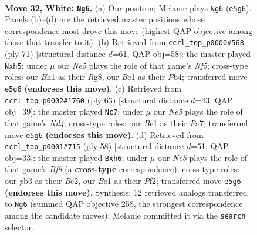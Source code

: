 \documentclass[11pt]{article}
\begin{document}
\clearpage

\begin{figure}[p]\centering
\begin{subfigure}{0.46\textwidth}\centering
\resizebox{\linewidth}{!}{%
\newchessgame
\chessboard[
  setfen={8/8/4k3/3pNp2/2pn1P2/1p6/1P2b3/1K2B2B w - - 0 32},
  showmover=false,
  pgfstyle=straightmove, color=movearrow, markmove={e5-g6}
]}
\caption{}
\end{subfigure}\hfill
\begin{subfigure}{0.46\textwidth}\centering
\resizebox{\linewidth}{!}{%
\newchessgame
\chessboard[
  setfen={6r1/p7/8/P2k1p1P/1p1p1n2/1P3KP1/3N1P2/5R2 b - - 2 36},
  showmover=false,
  pgfstyle=straightmove, color=movearrow, markmove={f4-h5}
]}
\caption{}
\end{subfigure}
\\[4pt]
\begin{subfigure}{0.46\textwidth}\centering
\resizebox{\linewidth}{!}{%
\newchessgame
\chessboard[
  setfen={7b/p2k1p2/2pp4/3n4/3PK1P1/1PP5/3BN3/8 b - - 0 32},
  showmover=false,
  pgfstyle=straightmove, color=movearrow, markmove={d5-c7}
]}
\caption{}
\end{subfigure}\hfill
\begin{subfigure}{0.46\textwidth}\centering
\resizebox{\linewidth}{!}{%
\newchessgame
\chessboard[
  setfen={4kB2/2n2p2/2p1pnbp/4N3/3P4/8/4BPP1/6K1 w - - 2 30},
  showmover=false,
  pgfstyle=straightmove, color=movearrow, markmove={f8-h6}
]}
\caption{}
\end{subfigure}
\caption{\textbf{Move 32, White: \texttt{Ng6}.} (a) Our position; Melanie plays \texttt{Ng6} (\texttt{e5g6}). Panels (b)--(d) are the retrieved master positions whose correspondence most drove this move (highest QAP objective among those that transfer to it). (b) Retrieved from \texttt{ccrl\_top\_p0000\#568} (ply 71) [structural distance $d$=61, QAP obj=58]: the master played \texttt{Nxh5}; under $\mu$ our \emph{Ne5} plays the role of that game's \emph{Nf5}; cross-type roles: our \emph{B}h1 as their \emph{R}g8, our \emph{B}e1 as their \emph{P}b4; transferred move \texttt{e5g6} \textbf{(endorses this move)}. (c) Retrieved from \texttt{ccrl\_top\_p0002\#1760} (ply 63) [structural distance $d$=43, QAP obj=39]: the master played \texttt{Nc7}; under $\mu$ our \emph{Ne5} plays the role of that game's \emph{Nd4}; cross-type roles: our \emph{B}e1 as their \emph{P}a7; transferred move \texttt{e5g6} \textbf{(endorses this move)}. (d) Retrieved from \texttt{ccrl\_top\_p0001\#715} (ply 58) [structural distance $d$=51, QAP obj=33]: the master played \texttt{Bxh6}; under $\mu$ our \emph{Ne5} plays the role of that game's \emph{Bf8} (a \textbf{cross-type} correspondence); cross-type roles: our \emph{p}b3 as their \emph{B}e2, our \emph{B}e1 as their \emph{P}f2; transferred move \texttt{e5g6} \textbf{(endorses this move)}. Synthesis: 12 retrieved analogs transferred to \texttt{Ng6} (summed QAP objective 258, the strongest correspondence among the candidate moves); Melanie committed it via the \texttt{search} selector.}
\label{fig:thought-m62}
\end{figure}
\end{document}
